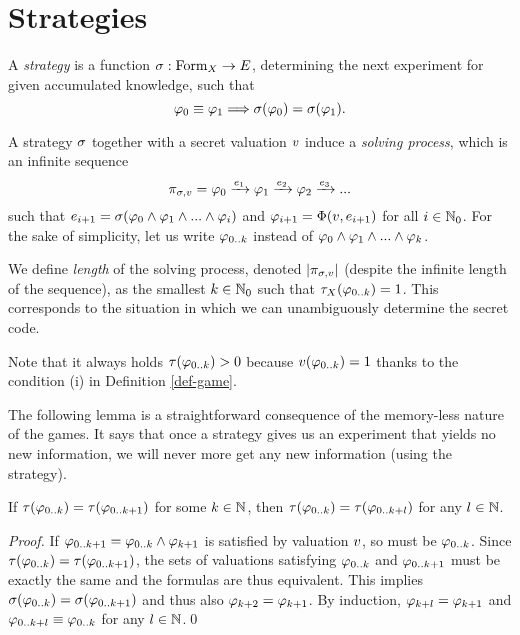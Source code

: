 \section{Strategies}

\begin{definition}
A \emph{strategy} is a function $\sigma: \textrm{Form}_X -> E$,
determining the next experiment for given accumulated knowledge,
such that
\[
\varphi_0 \equiv \varphi_1 ==> \sigma(\varphi_0) = \sigma(\varphi_1).
\]
\end{definition}

A strategy $\sigma$ together with a secret valuation $v$ induce
  a \emph{solving process}, which is an infinite sequence
\[
\pi_{\sigma,v} = \varphi_0 \xrightarrow{e_1} \varphi_1 \xrightarrow{e_2}
  \varphi_2 \xrightarrow{e_3} ...
\]
such that
$e_{i+1} = \sigma(\varphi_0 \wedge \varphi_1 \wedge ... \wedge \varphi_i)$ and
$\varphi_{i+1} = \Phi(v, e_{i+1})$ for all $i\in\mathbb{N}_0$.
For the sake of simplicity, let us write $\varphi_{0..k}$
instead of $\varphi_0 \wedge \varphi_1 \wedge ... \wedge \varphi_k$.

We define \emph{length} of the solving process,
  denoted $|\pi_{\sigma,v}|$
  (despite the infinite length of the sequence),
  as the smallest $k\in\mathbb{N}_0$ such that
  $\tau_X(\varphi_{0..k}) = 1$.
This corresponds to the situation in which we can unambiguously
  determine the secret code.

Note that it always holds $\tau(\varphi_{0..k}) > 0$ because
  $v(\varphi_{0..k}) = 1$ thanks to the condition (i)
  in Definition \ref{def-game}.

The following lemma is a straightforward consequence
  of the memory-less nature of the games. It says that once a strategy
  gives us an experiment that yields no new information, we will never more get
  any new information (using the strategy).

\begin{lemma}
If $\tau(\varphi_{0..k}) = \tau(\varphi_{0..k+1})$ for some $k\in\mathbb{N}$,
then $\tau(\varphi_{0..k}) = \tau(\varphi_{0..k+l})$ for any $l\in\mathbb{N}$.
\end{lemma}

\begin{proof}
If $\varphi_{0..k+1} = \varphi_{0..k} \wedge \varphi_{k+1}$
is satisfied by valuation $v$, so must be $\varphi_{0..k}$.
Since $\tau(\varphi_{0..k}) = \tau(\varphi_{0..k+1})$, the sets of
valuations satisfying $\varphi_{0..k}$ and $\varphi_{0..k+1}$ must be exactly the same
and the formulas are thus equivalent. This implies
$\sigma(\varphi_{0..k}) = \sigma(\varphi_{0..k+1})$ and thus also $\varphi_{k+2} = \varphi_{k+1}$.
By induction, $\varphi_{k+l} = \varphi_{k+1}$ and $\varphi_{0..k+l} \equiv \varphi_{0..k}$
 for any $l\in\mathbb{N}$.\qed
\end{proof}

